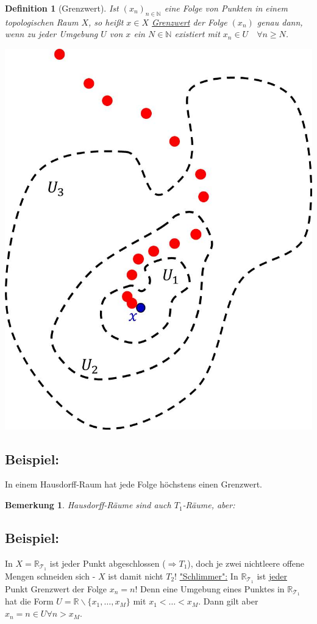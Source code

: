 \documentclass[a4paper,11pt,notitlepage]{report}
\newtheorem{definition}{Definition}[chapter]
\newtheorem{remark}{Bemerkung}[chapter]
\newcommand{\R}{{\ensuremath{\mathbb{R}}}}
\newcommand{\N}{{\ensuremath{\mathbb{N}}}}
\newenvironment{bsp}[1]
{
\setlength{\fboxsep}{10pt}
\subsection*{Beispiel: #1}
\begin{upshape}
}
{
\end{upshape}
}
\begin{document}
\begin{definition}[Grenzwert]
Ist $(x_n)_{n \in \N}$ eine Folge von Punkten in einem topologischen Raum $X$, so heißt $x \in X$ \underline{Grenzwert} der Folge $(x_n)$ genau dann, wenn zu jeder Umgebung $U$ von $x$ ein $N \in \N$ existiert mit $x_n \in U \quad \forall n \geq N$. 
\newline
\end{definition}
\begin{center}
	\includegraphics[scale=0.5]{images/Grenzwert.jpg}
\end{center}

\begin{bsp}{}
In einem Hausdorff-Raum hat jede Folge höchstens einen Grenzwert.
\end{bsp}

\begin{remark}
Hausdorff-Räume sind auch $T_1$-Räume, aber:
\end{remark}

\begin{bsp}{}
	In $X=\R_{\mathcal{T}_1}$ ist jeder Punkt abgeschlossen ($\Rightarrow T_1$), doch je zwei nichtleere offene Mengen schneiden sich - $X$ ist damit nicht $T_2$!
	\underline{"Schlimmer":} In $\R_{\mathcal{T}_1}$ ist \underline{jeder} Punkt Grenzwert der Folge $x_n = n$!
	Denn eine Umgebung eines Punktes in $\R_{\mathcal{T}_1}$ hat die Form $U = \R \backslash \{x_1, \ldots, x_M\}$ mit $x_1 < \ldots < x_M$. Dann gilt aber $x_n = n \in U \forall n > x_M$.
\end{bsp}
\end{document}
